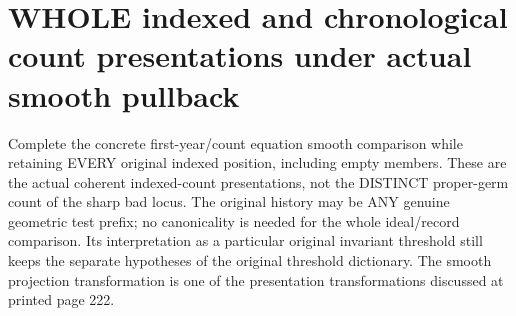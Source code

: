 \section{WHOLE indexed and chronological count presentations under actual smooth pullback}

Complete the concrete first-year/count equation smooth comparison while
retaining EVERY original indexed position, including empty members.
These are the actual coherent indexed-count presentations, not the
DISTINCT proper-germ count of the sharp bad locus. The original history
may be ANY genuine geometric test prefix; no canonicality is needed for
the whole ideal/record comparison. Its interpretation as a particular
original invariant threshold still keeps the separate hypotheses of the
original threshold dictionary. The smooth projection transformation is
one of the presentation transformations discussed at printed page 222.

